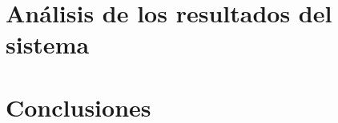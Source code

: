 \documentclass[runningheads]{llncs}
\begin{document}
	\section{An\'alisis de los resultados del sistema}
	
	
	\section{Conclusiones}
	
	
	
	\begin{thebibliography}{1}
		
	\end{thebibliography}
\end{document}
